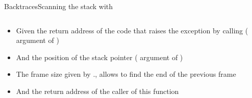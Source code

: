\begin{frame}{Backtraces}{Scanning the stack with }
  \begin{columns}[c]
    \begin{column}{0.5\textwidth}
      \begin{itemize}
        \item Given the return address of the code that raises the exception by calling  ( argument of )
        \item And the position of the stack pointer ( argument of )
        \item The frame size given by ., allows to find the end of the previous frame
        \item And the return address of the caller of this function
        \bigskip
      \end{itemize}
    \end{column}
    \begin{column}{0.5\textwidth}
      \raggedleft
    \end{column}
  \end{columns}
\end{frame}

